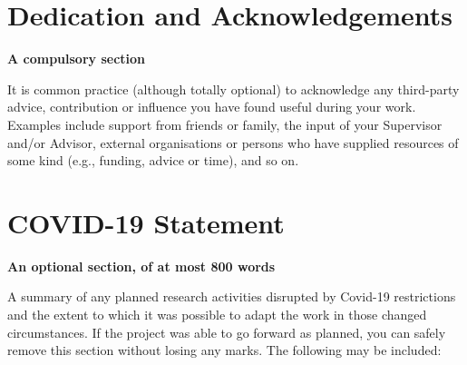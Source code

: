 \documentclass[oneside,%
                    author={Malak Hajji},
                    degree={BSc},
                    title={Designing An Accessible Computational Toolkit For Students},
                  subtitle={With Mixed Visual Abilities}]{dissertation}
\begin{document}


\chapter*{Dedication and Acknowledgements}

{\bf A compulsory section}
\vspace{1cm} 

\noindent
It is common practice (although totally optional) to acknowledge any
third-party advice, contribution or influence you have found useful
during your work.  Examples include support from friends or family, 
the input of your Supervisor and/or Advisor, external organisations 
or persons who  have supplied resources of some kind (e.g., funding, 
advice or time), and so on.


%

\mainmatter




\chapter*{COVID-19 Statement}

{\bf An optional section, of at most 800 words} 
\vspace{1cm} 

\noindent
A summary of any planned research activities disrupted by Covid-19 restrictions and the extent to which it was possible to adapt the work in those changed circumstances. If the project was able to go forward as planned, you can safely remove this section without losing any marks. The following may be included:
\end{document}
